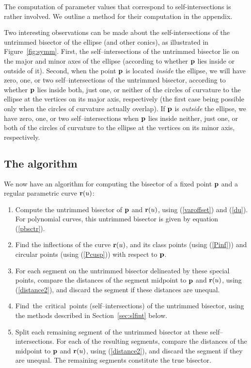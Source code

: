 The computation of parameter values that correspond to self-intersections is
rather involved.
We outline a method for their computation in the appendix.

\begin{rmk}
Two interesting observations can be made about
the self-intersections of the untrimmed bisector of the ellipse (and other
conics), as illustrated in Figure~\ref{fig:symm}.
First, the self--intersections of the untrimmed bisector lie on
the major and minor axes of the ellipse
(according to whether ${\bf p}$ lies inside or outside of it). 
Second, when the point ${\bf p}$ is located {\it inside\/} the ellipse, we will
have zero, one, or two self--intersections of the untrimmed bisector,
according to whether ${\bf p}$ lies inside both, just one, or
neither of the circles of curvature to the ellipse at the vertices on
its major axis, respectively (the first case being possible only when
the circles of curvature actually overlap). 
If ${\bf p}$ is {\it
outside\/} the ellipse, we have zero, one, or two self--intersections
when ${\bf p}$ lies inside neither, just one, or both of the
circles of curvature to the ellipse at the vertices on its minor axis,
respectively.
\end{rmk}


\subsection{The algorithm}

We now have an algorithm for computing the bisector of a fixed point
${\bf p}$ and a regular parametric curve ${\bf r}(u)$:

\begin{enumerate}
\item
        Compute the untrimmed bisector of ${\bf p}$ and ${\bf r}(u)$,
        using (\ref{varoffset}) and (\ref{du}). For polynomial 
        curves, this untrimmed bisector is given by equation (\ref{pbsctr}).
\item
        Find the inflections of the curve ${\bf r}(u)$, and its class
        points (using (\ref{Pinf}))
	and circular points (using (\ref{Pcusp})) 
	with respect to ${\bf p}$.
\item
        For each segment on the untrimmed bisector delineated by these
        special points, compare the distances of the segment midpoint
        to ${\bf p}$ and ${\bf r}(u)$, using (\ref{distance2}), and
        discard the segment if these distances are unequal.
\item
        Find~the~critical~points (self--intersections) of the untrimmed
        bisector, using the methods described in Section~\ref{sec:slfint}
        below.
\item
        Split each remaining segment of the untrimmed bisector at these
        self--intersections. For each of the resulting segments, compare
        the distances of the midpoint to ${\bf p}$ and ${\bf r}(u)$,
        using (\ref{distance2}), and discard the segment if they are
        unequal. The remaining segments constitute the true bisector.
\end{enumerate}

